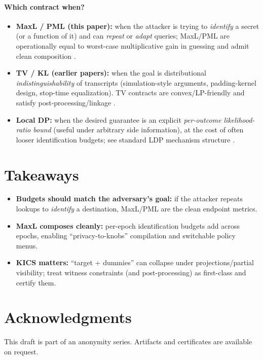 \documentclass[11pt]{article}
\begin{document}
\paragraph{Which contract when?}
\begin{itemize}
\item \textbf{MaxL / PML (this paper):} when the attacker is trying to \emph{identify} a secret (or a function of it) and can \emph{repeat} or \emph{adapt} queries; MaxL/PML are operationally equal to worst-case multiplicative gain in guessing and admit clean composition \cite{issa2020operational,saeidian2023pml}.
\item \textbf{TV / KL (earlier papers):} when the goal is distributional \emph{indistinguishability} of transcripts (simulation-style arguments, padding-kernel design, stop-time equalization). TV contracts are convex/LP-friendly and satisfy post-processing/linkage \cite{rassouli2018tv}.
\item \textbf{Local DP:} when the desired guarantee is an explicit \emph{per-outcome likelihood-ratio bound} (useful under arbitrary side information), at the cost of often looser identification budgets; see standard LDP mechanism structure \cite{duchi2013localprivacy,kairouz2016ldp}.
\end{itemize}

\section{Takeaways}
\begin{itemize}
\item \textbf{Budgets should match the adversary's goal:} if the attacker repeats lookups to \emph{identify} a destination, MaxL/PML are the clean endpoint metrics.
\item \textbf{MaxL composes cleanly:} per-epoch identification budgets add across epochs, enabling ``privacy-to-knobs'' compilation and switchable policy menus.
\item \textbf{KICS matters:} ``target + dummies'' can collapse under projections/partial visibility; treat witness constraints (and post-processing) as first-class and certify them.
\end{itemize}

\section*{Acknowledgments}
This draft is part of an anonymity series. Artifacts and certificates are available on request.
\end{document}
